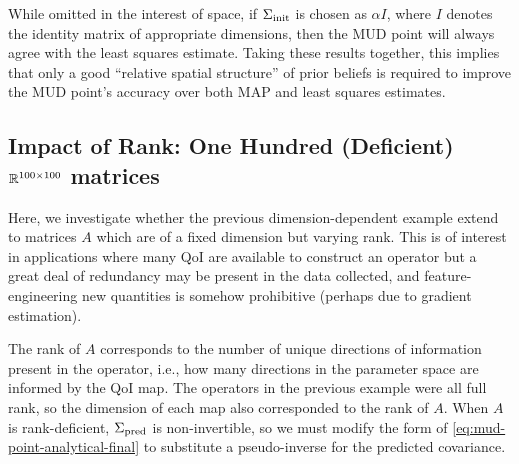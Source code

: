 While omitted in the interest of space, if $\Sigma_\text{init}$ is chosen as $\alpha I$, where $I$ denotes the identity matrix of appropriate dimensions, then the MUD point will always agree with the least squares estimate.
Taking these results together, this implies that only a good ``relative spatial structure'' of prior beliefs is required to improve the MUD point's accuracy over both MAP and least squares estimates.


\subsection{Impact of Rank: One Hundred (Deficient) $\mathbb{R}^{100 \times 100}$ matrices}

Here, we investigate whether the previous dimension-dependent example extend to matrices $A$ which are of a fixed dimension but varying rank.
This is of interest in applications where many QoI are available to construct an operator but a great deal of redundancy may be present in the data collected, and feature-engineering new quantities is somehow prohibitive (perhaps due to gradient estimation).


The rank of $A$ corresponds to the number of unique directions of information present in the operator, i.e., how many directions in the parameter space are informed by the QoI map.
The operators in the previous example were all full rank, so the dimension of each map also corresponded to the rank of $A$.
When $A$ is rank-deficient, $\Sigma_\text{pred}$ is non-invertible, so we must modify the form of \eqref{eq:mud-point-analytical-final} to substitute a pseudo-inverse for the predicted covariance.


